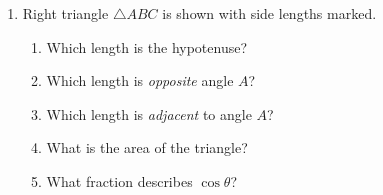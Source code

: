 \documentclass[12pt, twoside]{article}
\begin{document}
\begin{enumerate}
\item Right triangle $\triangle ABC$ is shown with side lengths marked.
\begin{multicols}{2}
  \begin{enumerate}
    \item Which length is the hypotenuse? \vspace{0.5cm}
    \item Which length is \emph{opposite} angle $A$?  \vspace{0.5cm}
    \item Which length is \emph{adjacent} to angle $A$? %
    \item What is the area of the triangle? \vspace{1cm}
    \item What fraction describes $\cos \theta$? \vspace{1cm}
  \end{enumerate}
\begin{flushright}
\end{flushright}
\end{multicols}


\end{enumerate}
\end{document}
